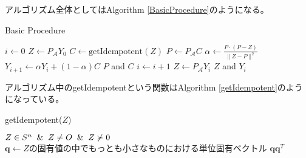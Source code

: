 アルゴリズム全体としてはAlgorithm \ref{BasicProcedure}のようになる。
\begin{algorithm}
  \caption{Basic Procedure}
  \label{BasicProcedure}
  \begin{algorithmic}[1]
    \State $i \leftarrow 0$
    \State $Z \leftarrow P_\mathcal{A} Y_0$
      \State $C \leftarrow \text{getIdempotent}(Z)$
      \State $P \leftarrow P_\mathcal{A} C$
        \State $\alpha \leftarrow \displaystyle{\frac{P \cdot (P - Z)}{\|Z - P\|^2}}$
        \State $Y_{i + 1} \leftarrow \alpha Y_i + (1 - \alpha) C$
      \Else
        \State \Return $P$ and $C$
      \EndIf
      \State $i \leftarrow i + 1$
      \State $Z \leftarrow P_\mathcal{A} Y_i$
    \EndWhile
    \State \Return $Z$ and $Y_i$
  \end{algorithmic}
\end{algorithm}

アルゴリズム中のgetIdempotentという関数はAlgorithm \ref{getIdempotent}のようになっている。
\begin{algorithm}
  \caption{getIdempotent($Z$)}
  \label{getIdempotent}
  \begin{algorithmic}[1]
    \Input $Z \in S^n \And Z \not= O \And Z \not\succ 0$
    \State $\mathbf{q} \leftarrow Z\text{の固有値の中でもっとも小さなものにおける単位固有ベクトル}$
    \State \Return $\mathbf{q} \mathbf{q}^T$
  \end{algorithmic}
\end{algorithm}

